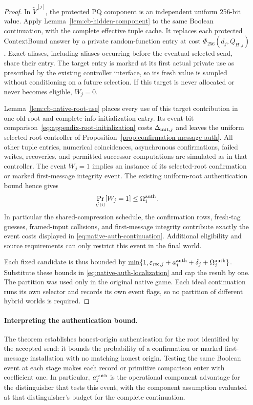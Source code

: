 \documentclass[pdflatex]{sn-jnl}
\theoremstyle{thmstyleone}
\theoremstyle{thmstylethree}
\theoremstyle{thmstyletwo}
\begin{document}
\begin{proof}
In $\widetilde V^{[j]}$, the protected PQ component is an independent uniform
256-bit value.  Apply Lemma~\ref{lem:cb-hidden-component} to the same Boolean
continuation, with the complete effective tuple cache.  It replaces each
protected ContextBound answer by a private random-function entry at cost
$\Phi_{256}(d_j,Q_{H,j})$.  Exact aliases, including aliases occurring before
the eventual selected send, share their entry.  The target entry is marked
at its first actual private use as prescribed by the existing controller
interface, so its fresh value is sampled without conditioning on a future
selection.  If this target is never allocated or never becomes eligible,
$W_j=0$.

Lemma~\ref{lem:cb-native-root-use} places every use of this target contribution
in one old-root and complete-info initialization entry.  Its event-bit
comparison~\eqref{eq:appendix-root-initialization} costs
$\Delta_{{\rm init},j}$ and leaves the uniform selected root controller of
Proposition~\ref{prop:confirmation-message-auth}.  All other tuple
entries, numerical coincidences, asynchronous confirmations, failed writes,
recoveries, and permitted successor computations are simulated as in that
controller.  The event $W_j=1$ implies an instance of its selected-root
confirmation or marked first-message integrity event.  The existing
uniform-root authentication bound hence gives
\[
 \Pr_{\widetilde V^{[j]}}[W_j=1]
 \le\Omega_j^{\rm auth}.
\]
In particular the shared-compression schedule, the confirmation rows,
fresh-tag guesses, framed-input collisions, and first-message integrity
contribute exactly the event costs displayed in
\eqref{eq:native-auth-continuation}.  Additional eligibility and source
requirements can only restrict this event in the final world.

Each fixed candidate is thus bounded by
$\min\{1,\varepsilon_{{\rm rec},j}+a_j^{\rm auth}+\delta_j
+\Omega_j^{\rm auth}\}$.  Substitute these bounds in
\eqref{eq:native-auth-localization} and cap the result by one.  The partition
was used only in the original native game.  Each ideal continuation runs its
own selector and records its own event flags, so no partition of different
hybrid worlds is required.
\end{proof}

\paragraph{Interpreting the authentication bound.}
The theorem establishes honest-origin authentication for the root
identified by the accepted send: it bounds the probability of a confirmation
or marked first-message installation with no matching honest origin.
Testing the same Boolean event at each stage makes each record or primitive comparison
enter with coefficient one. In particular, $a_j^{\rm auth}$ is the
operational component advantage for the distinguisher that tests this
event, with the component assumption evaluated at that distinguisher's
budget for the complete continuation.
\end{document}
